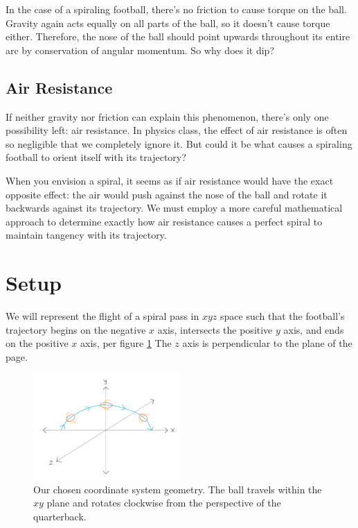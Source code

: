 \documentclass{article}
\begin{document}
In the case of a spiraling football, there's no friction to cause torque on the ball. Gravity again acts equally on all parts of the ball, so it doesn't cause torque either. Therefore, the nose of the ball should point upwards throughout its entire arc by conservation of angular momentum. So why does it dip?

\subsection{Air Resistance}
If neither gravity nor friction can explain this phenomenon, there's only one possibility left: air resistance. In physics class, the effect of air resistance is often so negligible that we completely ignore it. But could it be what causes a spiraling football to orient itself with its trajectory?

When you envision a spiral, it seems as if air resistance would have the exact opposite effect: the air would push against the nose of the ball and rotate it backwards against its trajectory. We must employ a more careful mathematical approach to determine exactly how air resistance causes a perfect spiral to maintain tangency with its trajectory.

\section{Setup}
We will represent the flight of a spiral pass in $xyz$ space such that the football's trajectory begins on the negative $x$ axis, intersects the positive $y$ axis, and ends on the positive $x$ axis, per figure \ref{space} The $z$ axis is perpendicular to the plane of the page.

\begin{figure}[h]
\centering
    \includegraphics[width=0.5\textwidth]{img/space.png}
    \caption{Our chosen coordinate system geometry. The ball travels within the $xy$ plane and rotates clockwise from the perspective of the quarterback.}
    \label{space}
\end{figure}
\end{document}
